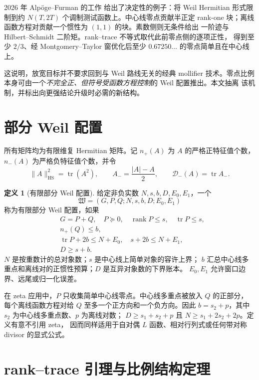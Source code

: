\documentclass[UTF8,11pt,a4paper]{ctexart}
\theoremstyle{definition}
\newtheorem{definition}[theorem]{定义}
\theoremstyle{remark}
\newcommand{\tr}{\operatorname{tr}}
\newcommand{\rank}{\operatorname{rank}}
\newcommand{\HS}{\mathrm{HS}}
\newcommand{\cW}{\mathfrak W}
\begin{document}
2026 年 Alpöge--Furman 的工作 \cite{AF26} 给出了决定性的例子：将 Weil
Hermitian 形式限制到约 $N(T,2T)$ 个调制测试函数上。中心线零点贡献半正定
rank-one 块；离线函数方程对贡献一个惯性为 $(1,1)$ 的块。素数侧则无条件给出
一阶迹与 Hilbert--Schmidt 二阶矩。rank--trace 不等式取代此前零点侧的逐项正性，
得到至少 $2/3$、经 Montgomery--Taylor 窗优化后至少 $0.67250\ldots$
的零点简单且在中心线上。

这说明，放宽目标并不要求回到与 Weil 路线无关的经典 mollifier 技术。零点比例
本身可由一个\emph{不完全正、但符号受函数方程控制}的 Weil 配置推出。本文抽离
该机制，并标出向更强结论升级时必需的新结构。

\section{部分 Weil 配置}

所有矩阵均为有限维复 Hermitian 矩阵。记 $n_+(A)$ 为 $A$ 的严格正特征值个数，
$n_-(A)$ 为严格负特征值个数，并令
\[
 \|A\|_{\HS}^2=\tr(A^2),\qquad
 A_-=\frac{|A|-A}{2},\qquad \mathcal{D}_-(A)=\tr A_-.
\]

\begin{definition}[有限部分 Weil 配置]
给定非负实数 $N,s,b,D,E_0,E_1$，一个
\[
 \cW=(G,P,Q;N,s,b,D;E_0,E_1)
\]
称为有限部分 Weil 配置，如果
\begin{align}
 &G=P+Q,\quad P\succeq0,\quad \rank P\le s,\quad \tr P\le s, \label{eq:pw1}\\
 &n_+(Q)\le b, \label{eq:pw2}\\
 &\tr P+2b\le N+E_0,\quad s+2b\le N+E_1, \label{eq:pw3}\\
 &D\ge s+b. \label{eq:pw4}
\end{align}
$N$ 是按重数计的总对象数；$s$ 是中心线上简单对象的容许上界；
$b$ 汇总中心线多重点和离线对的正惯性预算；$D$ 是互异对象数的下界账本。
$E_0,E_1$ 允许窗口边界、远尾或归一化误差。
\end{definition}

在 zeta 应用中，$P$ 只收集简单中心线零点。中心线多重点被放入 $Q$ 的正部分，
每个离线函数方程对给 $Q$ 至多一个正方向和一个负方向。因此
$b=s_2+p$，其中 $s_2$ 为中心线多重点数、$p$ 为离线对数；
$D\ge s_1+s_2+p$ 且 $N\ge s_1+2s_2+2p$。定义有意不引用 zeta，
因而同样适用于自对偶 $L$ 函数、相对行列式或任何带对称 divisor 的显式公式。

\section{rank--trace 引理与比例结构定理}
\end{document}
